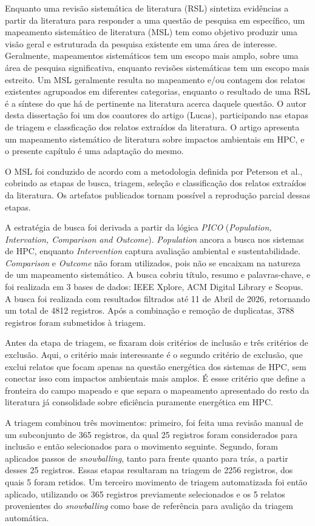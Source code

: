 Enquanto uma revisão sistemática de literatura (RSL) sintetiza evidências a partir da literatura 
para responder a uma questão de pesquisa em específico, um mapeamento sistemático de literatura (MSL) tem como
objetivo produzir uma visão geral e estruturada da pesquisa existente em uma área de interesse. Geralmente, 
mapeamentos sistemáticos tem um escopo mais amplo, sobre uma área de pesquisa significativa, enquanto
revisões sistemáticas tem um escopo mais estreito. Um MSL geralmente resulta no mapeamento e/ou contagem
dos relatos existentes agrupoados em diferentes categorias, enquanto o resultado de uma RSL é 
a síntese do que há de pertinente na literatura acerca daquele questão. O autor desta dissertação
foi um dos coautores do artigo (Lucas), participando nas etapas de triagem e classficação dos relatos
extraídos da literatura. O artigo apresenta um mapeamento sistemático de literatura sobre 
impactos ambientais em HPC, e o presente capítulo é uma adaptação do mesmo.

O MSL foi conduzido de acordo com a metodologia definida por Peterson et al., cobrindo as etapas
de busca, triagem, seleção e classificação dos relatos extraídos da literatura. Os artefatos publicados
tornam possível a reprodução parcial dessas etapas. 

A estratégia de busca foi derivada a partir da lógica \emph{PICO} (\textit{Population, Intervation,
Comparison and Outcome}). \textit{Population} ancora a busca nos sistemas de HPC, enquanto 
\textit{Intervention} captura avaliação ambiental e sustentabilidade. \textit{Comparison} e 
\textit{Outcome} não foram utilizados, pois não se encaixam na natureza de um mapeamento sistemático.
A busca cobriu título, resumo e palavras-chave, e foi realizada em 3 bases de dados: IEEE Xplore,
ACM Digital Library e Scopus. A busca foi realizada com resultados filtrados até 11 de Abril de 2026,
retornando um total de 4812 registros. Após a combinação e remoção de duplicatas, 3788 registros 
foram submetidos à triagem.

Antes da etapa de triagem, se fixaram dois critérios de inclusão e três critérios de exclusão. 
Aqui, o critério mais interessante é o segundo critério de exclusão, que exclui relatos que focam
apenas na questão energética dos sistemas de HPC, sem conectar isso com impactos ambientais
mais amplos. É essse critério que define a fronteira do campo mapeado e que separa o mapeamento
apresentado do resto da literatura já consolidade sobre eficiência puramente energética em HPC.

A triagem combinou três movimentos: primeiro, foi feita uma revisão manual de um subconjunto 
de 365 registros, da qual 25 registros foram considerados para inclusão e então selecionados para o movimento seguinte. Segundo, foram
aplicados passos de \textit{snowballing}, tanto para frente quanto para trás, a partir desses 25 registros. Essas
etapas resultaram na triagem de 2256 registros, dos quais 5 foram retidos. Um terceiro movimento de triagem automatizada foi então
aplicado, utilizando os 365 registros previamente selecionados e os 5 relatos provenientes do \textit{snowballing} como base de 
referência para avalição da triagem automática.

